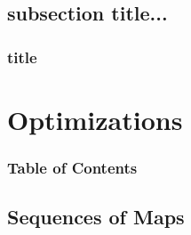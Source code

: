 \documentclass[xcolor=dvipsnames]{beamer}
\begin{document}
	
	\subsection{subsection title...}
	
		\begin{frame} \frametitle{title}
	
		\end{frame}

\section{Optimizations} 

	\begin{frame} \frametitle{Table of Contents}
		\tableofcontents[currentsection]
	\end{frame} 
	
	
	\subsection{Sequences of Maps}
	
\end{document}
